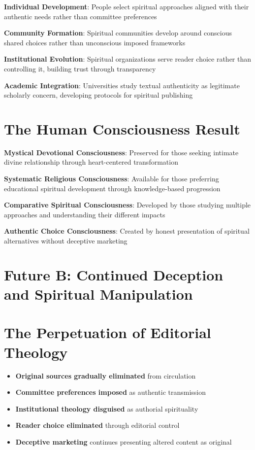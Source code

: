 \documentclass[11pt,twoside]{book}
\begin{document}
\textbf{\textbf{Individual Development}}: People select spiritual approaches aligned with their authentic needs rather than committee preferences

\textbf{\textbf{Community Formation}}: Spiritual communities develop around conscious shared choices rather than unconscious imposed frameworks

\textbf{\textbf{Institutional Evolution}}: Spiritual organizations serve reader choice rather than controlling it, building trust through transparency

\textbf{\textbf{Academic Integration}}: Universities study textual authenticity as legitimate scholarly concern, developing protocols for spiritual publishing
\section*{The Human Consciousness Result}
\label{sec:orgcb925da}
\textbf{\textbf{Mystical Devotional Consciousness}}: Preserved for those seeking intimate divine relationship through heart-centered transformation

\textbf{\textbf{Systematic Religious Consciousness}}: Available for those preferring educational spiritual development through knowledge-based progression

\textbf{\textbf{Comparative Spiritual Consciousness}}: Developed by those studying multiple approaches and understanding their different impacts

\textbf{\textbf{Authentic Choice Consciousness}}: Created by honest presentation of spiritual alternatives without deceptive marketing
\section*{Future B: Continued Deception and Spiritual Manipulation}
\label{sec:orgd4b771d}

\section*{The Perpetuation of Editorial Theology}
\label{sec:org5a56865}
\begin{itemize}
\item \textbf{\textbf{Original sources gradually eliminated}} from circulation
\item \textbf{\textbf{Committee preferences imposed}} as authentic transmission
\item \textbf{\textbf{Institutional theology disguised}} as authorial spirituality
\item \textbf{\textbf{Reader choice eliminated}} through editorial control
\item \textbf{\textbf{Deceptive marketing}} continues presenting altered content as original
\end{itemize}
\end{document}

